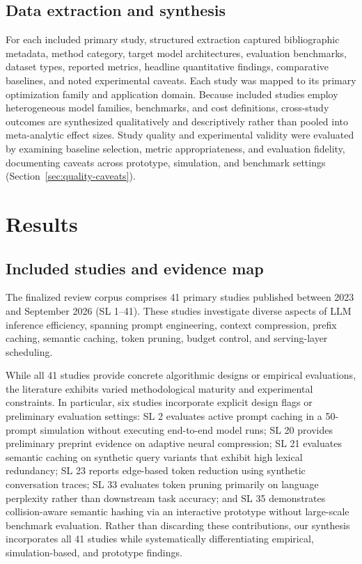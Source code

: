 \IfFileExists{jair.cls}{\documentclass{jair}}{\documentclass[manuscript,nonacm,screen]{acmart}}
\begin{document}
\subsection{Data extraction and synthesis}

For each included primary study, structured extraction captured bibliographic metadata, method category, target model architectures, evaluation benchmarks, dataset types, reported metrics, headline quantitative findings, comparative baselines, and noted experimental caveats. Each study was mapped to its primary optimization family and application domain. Because included studies employ heterogeneous model families, benchmarks, and cost definitions, cross-study outcomes are synthesized qualitatively and descriptively rather than pooled into meta-analytic effect sizes. Study quality and experimental validity were evaluated by examining baseline selection, metric appropriateness, and evaluation fidelity, documenting caveats across prototype, simulation, and benchmark settings (Section~\ref{sec:quality-caveats}).

\section{Results}

\subsection{Included studies and evidence map}

The finalized review corpus comprises 41 primary studies published between 2023 and September 2026 (SL 1--41). These studies investigate diverse aspects of LLM inference efficiency, spanning prompt engineering, context compression, prefix caching, semantic caching, token pruning, budget control, and serving-layer scheduling.

While all 41 studies provide concrete algorithmic designs or empirical evaluations, the literature exhibits varied methodological maturity and experimental constraints. In particular, six studies incorporate explicit design flags or preliminary evaluation settings: SL 2 evaluates active prompt caching in a 50-prompt simulation without executing end-to-end model runs; SL 20 provides preliminary preprint evidence on adaptive neural compression; SL 21 evaluates semantic caching on synthetic query variants that exhibit high lexical redundancy; SL 23 reports edge-based token reduction using synthetic conversation traces; SL 33 evaluates token pruning primarily on language perplexity rather than downstream task accuracy; and SL 35 demonstrates collision-aware semantic hashing via an interactive prototype without large-scale benchmark evaluation. Rather than discarding these contributions, our synthesis incorporates all 41 studies while systematically differentiating empirical, simulation-based, and prototype findings.
\end{document}
